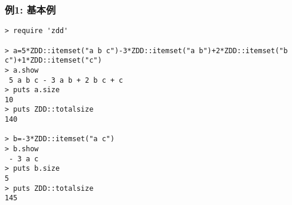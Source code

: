 \subsubsection*{例1: 基本例}



\begin{Verbatim}[baselinestretch=0.7,frame=single]
> require 'zdd'

> a=5*ZDD::itemset("a b c")-3*ZDD::itemset("a b")+2*ZDD::itemset("b c")+1*ZDD::itemset("c")
> a.show
 5 a b c - 3 a b + 2 b c + c
> puts a.size
10
> puts ZDD::totalsize
140

> b=-3*ZDD::itemset("a c")
> b.show
 - 3 a c
> puts b.size
5
> puts ZDD::totalsize
145
\end{Verbatim}
